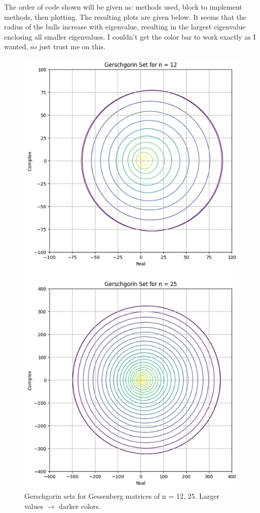 \partbreak
\begin{solution}
    The order of code shown will be given as: methods used, block to implement methods, then plotting. The resulting plots are given below. It seems that the radius of the balls increase with eigenvalue, resulting in the largest eigenvalue enclosing all smaller eigenvalues. I couldn't get the color bar to work exactly as I wanted, so just trust me on this.  

\vspace{\floatsep}
\clearpage

\jump
\begin{figure}[!ht]
\centering
\includegraphics[scale = 0.6]{Images/gerschgorin balls.png}
\caption{Gerschgorin sets for Gessenberg matrices of n = 12, 25. Larger values $\rightarrow$ darker colors. }
\label{png:gerschgorin sets}
\end{figure}


\end{solution}
